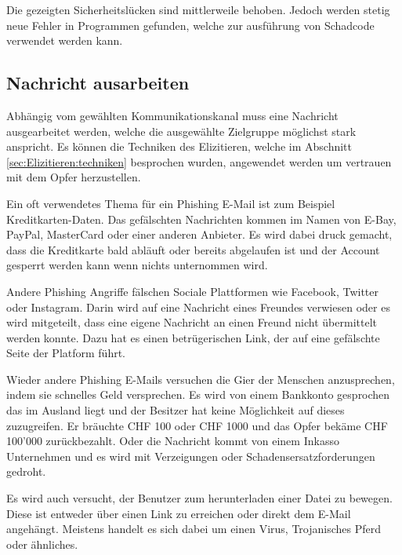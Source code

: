Die gezeigten Sicherheitslücken sind mittlerweile behoben. Jedoch werden stetig neue Fehler in Programmen gefunden, welche zur ausführung von Schadcode verwendet werden kann.

\subsection{Nachricht ausarbeiten}
Abhängig vom gewählten Kommunikationskanal muss eine Nachricht ausgearbeitet werden, welche die ausgewählte Zielgruppe möglichst stark anspricht.
Es können die Techniken des Elizitieren, welche im Abschnitt \ref{sec:Elizitieren:techniken} besprochen wurden, angewendet werden um vertrauen mit dem Opfer herzustellen.

Ein oft verwendetes Thema für ein Phishing E-Mail ist zum Beispiel Kreditkarten-Daten. Das gefälschten Nachrichten kommen im Namen von E-Bay, PayPal, MasterCard oder einer anderen Anbieter. Es wird dabei druck gemacht, dass die Kreditkarte bald abläuft oder bereits abgelaufen ist und der Account gesperrt werden kann wenn nichts unternommen wird. 

Andere Phishing Angriffe fälschen Sociale Plattformen wie Facebook, Twitter oder Instagram. Darin wird auf eine Nachricht eines Freundes verwiesen oder es wird mitgeteilt, dass eine eigene Nachricht an einen Freund nicht übermittelt werden konnte. Dazu hat es einen betrügerischen Link, der auf eine gefälschte Seite der Platform führt.

Wieder andere Phishing E-Mails versuchen die Gier der Menschen anzusprechen, indem sie schnelles Geld versprechen. Es wird von einem Bankkonto gesprochen das im Ausland liegt und der Besitzer hat keine Möglichkeit auf dieses zuzugreifen. Er bräuchte CHF 100 oder CHF 1000 und das Opfer bekäme CHF 100'000 zurückbezahlt. Oder die Nachricht kommt von einem Inkasso Unternehmen und es wird mit Verzeigungen oder Schadensersatzforderungen gedroht.

Es wird auch versucht, der Benutzer zum herunterladen einer Datei zu bewegen. Diese ist entweder über einen Link zu erreichen oder direkt dem E-Mail angehängt. Meistens handelt es sich dabei um einen Virus, Trojanisches Pferd oder ähnliches. 


